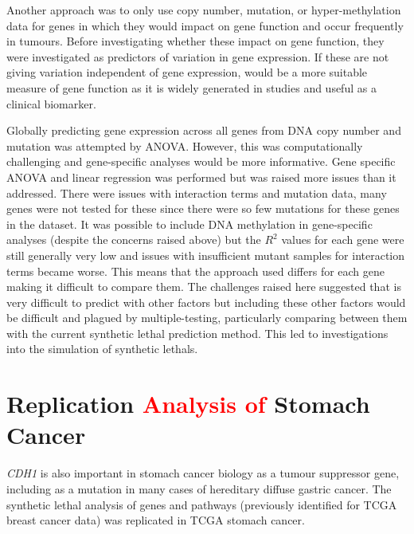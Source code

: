 Another approach was to only use copy number, \gls{mutation}, or hyper-methylation data for genes in which they would impact on gene function and occur frequently in tumours. Before investigating whether these impact on gene function, they were investigated as predictors of variation in \gls{gene expression}. If these are not giving variation independent of \gls{gene expression},  would be a more suitable measure of gene function as it is widely generated in studies and useful as a clinical biomarker.

Globally predicting \gls{gene expression} across all genes from \acrshort{DNA} copy number and  \gls{mutation} was attempted by \gls{ANOVA}. However, this was computationally challenging and gene-specific analyses would be more informative. Gene specific \gls{ANOVA} and linear regression was performed but was raised more issues than it addressed. There were issues with interaction terms and \gls{mutation} data, many genes were not tested for these since there were so few \glspl{mutation} for these genes in the dataset.  It was possible to include \acrshort{DNA} methylation in gene-specific analyses (despite the concerns raised above) but the $R^2$ values for each gene were still generally very low and issues with insufficient \gls{mutant} samples for interaction terms became worse. This means that the approach used differs for each gene making it difficult to compare them. The challenges raised here suggested that  is very difficult to predict with other factors but including these other factors would be difficult and plagued by multiple-testing, particularly comparing between them with the current \gls{synthetic lethal} prediction method. This led to investigations into the simulation of \glspl{synthetic lethal}.
\fi

\FloatBarrier

\section{Replication \textcolor{red}{Analysis of} Stomach Cancer} \label{chapt3:stad_replication}

\textit{CDH1} is also important in stomach cancer biology as a  \gls{tumour suppressor} gene, including as a  \gls{mutation} in many cases of \gls{hereditary} diffuse gastric cancer. The \gls{synthetic lethal} analysis of genes and \glspl{pathway} (previously identified for \gls{TCGA} breast cancer data) was replicated in \gls{TCGA} stomach cancer. %

